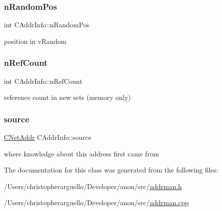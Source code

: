 \subsubsection{\texorpdfstring{n\+Random\+Pos}{nRandomPos}}
{\footnotesize\ttfamily int C\+Addr\+Info\+::n\+Random\+Pos\hspace{0.3cm}{\ttfamily [private]}}



position in v\+Random 

\mbox{\label{class_c_addr_info_ada2f8362fe6ed379a6fdaa3aef682e45}} 
\subsubsection{\texorpdfstring{n\+Ref\+Count}{nRefCount}}
{\footnotesize\ttfamily int C\+Addr\+Info\+::n\+Ref\+Count\hspace{0.3cm}{\ttfamily [private]}}



reference count in new sets (memory only) 

\mbox{\label{class_c_addr_info_adf38b9b84f6e9ec5f16bc265c5fcd2dd}} 
\subsubsection{\texorpdfstring{source}{source}}
{\footnotesize\ttfamily \mbox{\hyperlink{class_c_net_addr}{C\+Net\+Addr}} C\+Addr\+Info\+::source\hspace{0.3cm}{\ttfamily [private]}}



where knowledge about this address first came from 



The documentation for this class was generated from the following files\+:\begin{DoxyCompactItemize}
\item 
/\+Users/christopherarguello/\+Developer/anon/src/\mbox{\hyperlink{addrman_8h}{addrman.\+h}}\item 
/\+Users/christopherarguello/\+Developer/anon/src/\mbox{\hyperlink{addrman_8cpp}{addrman.\+cpp}}\end{DoxyCompactItemize}

